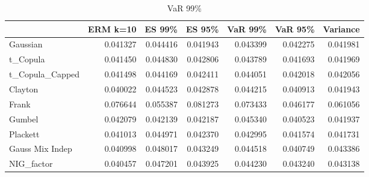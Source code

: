 \begin{table}
            \centering
\begin{tabular}{lrrrrrr}
\toprule
{} &  ERM k=10 &    ES 99\% &    ES 95\% &   VaR 99\% &   VaR 95\% &  Variance \\
\midrule
Gaussian        &  \color{blue}0.041327 &  0.044416 &  \color{green}0.041943 &  0.043399 &  0.042275 &  0.041981 \\
t\_Copula        &  \color{blue}0.041450 &  0.044830 &  0.042806 &  0.043789 &  0.041693 &  0.041969 \\
t\_Copula\_Capped &  \color{blue}0.041498 &  0.044169 &  0.042411 &  0.044051 &  0.042018 &  0.042056 \\
Clayton         &  \color{red}0.040022 &  0.044523 &  0.042878 &  0.044215 &  0.040913 &  0.041943 \\
Frank           &  0.076644 &  0.055387 &  0.081273 &  0.073433 &  \color{blue}0.046177 &  0.061056 \\
Gumbel          &  0.042079 &  \color{green}0.042139 &  0.042187 &  0.045340 &  \color{blue}0.040523 &  0.041937 \\
Plackett        &  \color{blue}0.041013 &  0.044971 &  0.042370 &  \color{green}0.042995 &  0.041574 &  \color{green}0.041731 \\
Gauss Mix Indep &  0.040998 &  0.048017 &  0.043249 &  0.044518 &  \color{blue}0.040749 &  0.043386 \\
NIG\_factor      &  \color{blue}0.040457 &  0.047201 &  0.043925 &  0.044230 &  0.043240 &  0.043138 \\
\bottomrule
\end{tabular}
\caption{VaR 99\%}
    \label{table:OOSRHVaR99}
\end{table}

